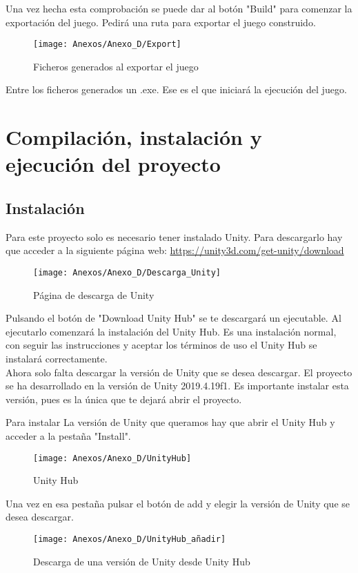 Una vez hecha esta comprobación se puede dar al botón "Build" para comenzar la exportación del juego. Pedirá una ruta para exportar el juego construido.

\begin{figure}[h]
\centering
\texttt{[image: Anexos/Anexo\_D/Export]}
\caption{Ficheros generados al exportar el juego}
\end{figure}

Entre los ficheros generados un .exe. Ese es el que iniciará la ejecución del juego.

\section{Compilación, instalación y ejecución del proyecto}

\subsection{Instalación}
Para este proyecto solo es necesario tener instalado Unity. Para descargarlo hay que acceder a la siguiente página web: \url{https://unity3d.com/get-unity/download}

\begin{figure}[h]
\centering
\texttt{[image: Anexos/Anexo\_D/Descarga\_Unity]}
\caption{Página de descarga de Unity}
\end{figure}

Pulsando el botón de "Download Unity Hub" se te descargará un ejecutable. Al ejecutarlo comenzará la instalación del Unity Hub. Es una instalación normal, con seguir las instrucciones y aceptar los términos de uso el Unity Hub se instalará correctamente.\\
Ahora solo falta descargar la versión de Unity que se desea descargar. El proyecto se ha desarrollado en la versión de Unity 2019.4.19f1. Es importante instalar esta versión, pues es la única que te dejará abrir el proyecto.

Para instalar La versión de Unity que queramos hay que abrir el Unity Hub y acceder a la pestaña "Install".

\clearpage
\begin{figure}[h]
\centering
\texttt{[image: Anexos/Anexo\_D/UnityHub]}
\caption{Unity Hub}
\end{figure}

Una vez en esa pestaña pulsar el botón de add y elegir la versión de Unity que se desea descargar.

\begin{figure}[h]
\centering
\texttt{[image: Anexos/Anexo\_D/UnityHub\_añadir]}
\caption{Descarga de una versión de Unity desde Unity Hub}
\end{figure}

